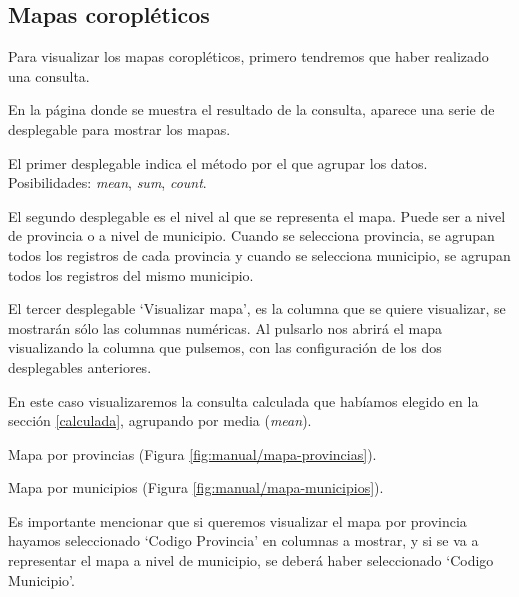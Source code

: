 
\subsection{Mapas coropléticos}

Para visualizar los mapas coropléticos, primero tendremos que haber realizado una consulta.

En la página donde se muestra el resultado de la consulta, aparece una serie de desplegable para mostrar los mapas. 


El primer desplegable indica el método por el que agrupar los datos. Posibilidades: \textit{mean}, \textit{sum}, \textit{count}.

El segundo desplegable es el nivel al que se representa el mapa. Puede ser a nivel de provincia o a nivel de municipio. Cuando se selecciona provincia, se agrupan todos los registros de cada provincia y cuando se selecciona municipio, se agrupan todos los registros del mismo municipio.

El tercer desplegable `Visualizar mapa', es la columna que se quiere visualizar, se mostrarán sólo las columnas numéricas. Al pulsarlo nos abrirá el mapa visualizando la columna que pulsemos, con las configuración de los dos desplegables anteriores.


En este caso visualizaremos la consulta calculada que habíamos elegido en la sección \ref{calculada}, agrupando por media (\textit{mean}).

Mapa por provincias (Figura \ref{fig:manual/mapa-provincias}).


Mapa por municipios (Figura \ref{fig:manual/mapa-municipios}).


Es importante mencionar que si queremos visualizar el mapa por provincia hayamos seleccionado `Codigo Provincia' en columnas a mostrar, y si se va a representar el mapa a nivel de municipio, se deberá haber seleccionado `Codigo Municipio'. 


